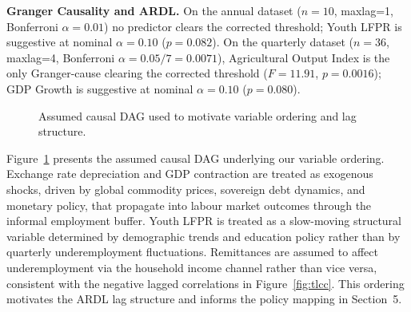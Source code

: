 \documentclass[sigconf]{acmart}
\begin{document}
\textbf{Granger Causality and ARDL.} On the annual dataset ($n{=}10$,
maxlag=1, Bonferroni $\alpha{=}0.01$) no predictor clears the corrected
threshold; Youth LFPR is suggestive at nominal $\alpha{=}0.10$
($p{=}0.082$). On the quarterly dataset ($n{=}36$, maxlag=4, Bonferroni
$\alpha{=}0.05/7{=}0.0071$), Agricultural Output Index is the only
Granger-cause clearing the corrected threshold ($F{=}11.91$, $p{=}0.0016$);
GDP Growth is suggestive at nominal $\alpha{=}0.10$ ($p{=}0.080$).

\begin{figure}[h]
  \centering
  \caption{Assumed causal DAG used to motivate variable ordering and lag structure.}
  \label{fig:causal_dag}
\end{figure}

Figure~\ref{fig:causal_dag} presents the assumed causal DAG underlying our variable ordering. Exchange rate depreciation and GDP contraction are treated as exogenous shocks, driven by global commodity prices, sovereign debt dynamics, and monetary policy, that propagate into labour market outcomes through the informal employment buffer. Youth LFPR is treated as a slow-moving structural variable determined by demographic trends and education policy rather than by quarterly underemployment fluctuations. Remittances are assumed to affect underemployment via the household income channel rather than vice versa, consistent with the negative lagged correlations in Figure~\ref{fig:tlcc}. This ordering motivates the ARDL lag structure and informs the policy mapping in Section~5.
\end{document}
